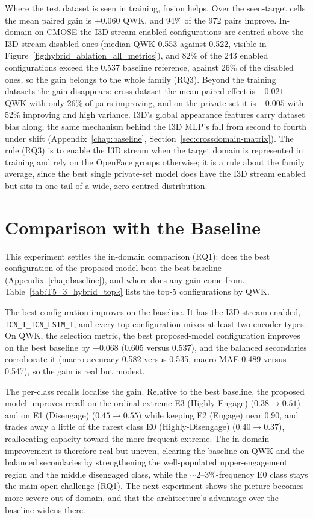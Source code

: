 \documentclass[../main.tex]{subfiles}
\begin{document}
Where the test dataset is seen in training, fusion helps. Over the seen-target cells the mean paired gain is $+0.060$ QWK, and 94\% of the 972 pairs improve. In-domain on CMOSE the I3D-stream-enabled configurations are centred above the I3D-stream-disabled ones (median QWK 0.553 against 0.522, visible in Figure~\ref{fig:hybrid_ablation_all_metrics}), and 82\% of the 243 enabled configurations exceed the 0.537 baseline reference, against 26\% of the disabled ones, so the gain belongs to the whole family (RQ3). Beyond the training datasets the gain disappears: cross-dataset the mean paired effect is $-0.021$ QWK with only 26\% of pairs improving, and on the private set it is $+0.005$ with 52\% improving and high variance. I3D's global appearance features carry dataset bias along, the same mechanism behind the I3D MLP's fall from second to fourth under shift (Appendix~\ref{chap:baseline}, Section~\ref{sec:crossdomain-matrix}). The rule (RQ3) is to enable the I3D stream when the target domain is represented in training and rely on the OpenFace groups otherwise; it is a rule about the family average, since the best single private-set model does have the I3D stream enabled but sits in one tail of a wide, zero-centred distribution.

\FloatBarrier
\section{Comparison with the Baseline}
\label{sec:error}

This experiment settles the in-domain comparison (RQ1): does the best configuration of the proposed model beat the best baseline (Appendix~\ref{chap:baseline}), and where does any gain come from. Table~\ref{tab:T5_3_hybrid_topk} lists the top-5 configurations by QWK.


The best configuration improves on the baseline. It has the I3D stream enabled, \texttt{TCN\_T\_TCN\_LSTM\_T}, and every top configuration mixes at least two encoder types. On QWK, the selection metric, the best proposed-model configuration improves on the best baseline by $+0.068$ (0.605 versus 0.537), and the balanced secondaries corroborate it (macro-accuracy 0.582 versus 0.535, macro-MAE 0.489 versus 0.547), so the gain is real but modest.

The per-class recalls localise the gain. Relative to the best baseline, the proposed model improves recall on the ordinal extreme E3 (Highly\nobreakdash-Engage) ($0.38\to0.51$) and on E1 (Disengage) ($0.45\to0.55$) while keeping E2 (Engage) near 0.90, and trades away a little of the rarest class E0 (Highly\nobreakdash-Disengage) ($0.40\to0.37$), reallocating capacity toward the more frequent extreme. The in-domain improvement is therefore real but uneven, clearing the baseline on QWK and the balanced secondaries by strengthening the well-populated upper-engagement region and the middle disengaged class, while the $\sim$2--3\%-frequency E0 class stays the main open challenge (RQ1). The next experiment shows the picture becomes more severe out of domain, and that the architecture's advantage over the baseline widens there.
\end{document}
